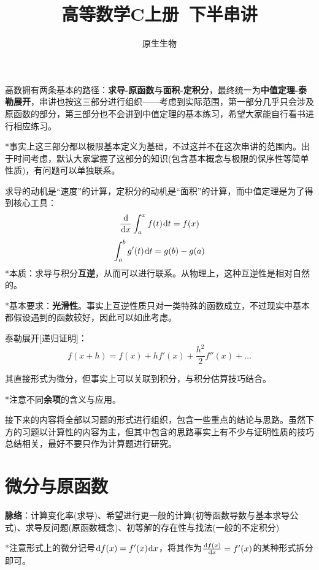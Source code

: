 \documentclass[a4paper,UTF8,fontset=windows]{ctexart}
\title{\textbf{高等数学C上册\ 下半串讲}}
\author{原生生物}
\date{}
\newcommand*{\dr}{\hspace{0.07em}\mathrm{d}}
\begin{document}
\maketitle
高数拥有两条基本的路径：\textbf{求导-原函数}与\textbf{面积-定积分}，最终统一为\textbf{中值定理-泰勒展开}，串讲也按这三部分进行组织——考虑到实际范围，第一部分几乎只会涉及原函数的部分，第三部分也不会讲到中值定理的基本练习，希望大家能自行看书进行相应练习。

*事实上这三部分都以极限基本定义为基础，不过这并不在这次串讲的范围内。出于时间考虑，默认大家掌握了这部分的知识(包含基本概念与极限的保序性等简单性质)，有问题可以单独联系。

求导的动机是``速度''的计算，定积分的动机是``面积''的计算，而中值定理是为了得到核心工具：
$$\frac{\dr}{\dr x}\int_a^xf(t)\dr t=f(x)$$
$$\int_a^bg'(t)\dr t=g(b)-g(a)$$
*本质：求导与积分\textbf{互逆}，从而可以进行联系。从物理上，这种互逆性是相对自然的。

*基本要求：\textbf{光滑性}。事实上互逆性质只对一类特殊的函数成立，不过现实中基本都假设遇到的函数较好，因此可以如此考虑。

泰勒展开[递归证明]：
$$f(x+h)=f(x)+hf'(x)+\frac{h^2}{2}f''(x)+\dots$$

其直接形式为微分，但事实上可以关联到积分，与积分估算技巧结合。

*注意不同\textbf{余项}的含义与应用。

接下来的内容将全部以习题的形式进行组织，包含一些重点的结论与思路。虽然下方的习题以计算性的内容为主，但其中包含的思路事实上有不少与证明性质的技巧总结相关，最好不要只作为计算题进行研究。

\section{微分与原函数}
\textbf{脉络}：计算变化率(求导)、希望进行更一般的计算(初等函数导数与基本求导公式)、求导反问题(原函数概念)、初等解的存在性与找法(一般的不定积分)

*注意形式上的微分记号$\dr f(x)=f'(x)\dr x$，将其作为$\frac{\dr f(x)}{\dr x}=f'(x)$的某种形式拆分即可。
\end{document}
